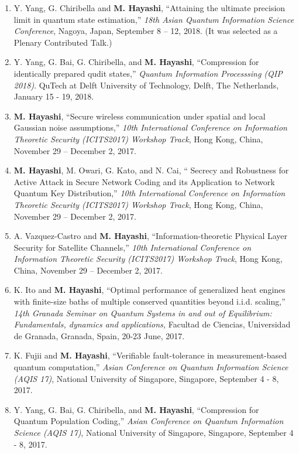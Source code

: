 \documentclass[a4paper,12pt,oneside]{article}
\begin{document}
\begin{enumerate}
\item 
Y. Yang, G. Chiribella and \textbf{M. Hayashi},
``Attaining the ultimate precision limit in quantum state estimation,''
{\em 18th Asian Quantum Information Science Conference},
Nagoya, Japan, September 8 -- 12, 2018.
(It was selected as a Plenary Contributed Talk.)

\item 
Y. Yang, G. Bai, G. Chiribella, and \textbf{M. Hayashi}, 
``Compression for identically prepared qudit states,'' 
{\em Quantum Information Processsing (QIP 2018)}.
QuTech at Delft University of Technology, Delft, The Netherlands,
January 15 - 19, 2018.

\item 
\textbf{M. Hayashi},
``Secure wireless communication under spatial and local Gaussian noise assumptions,''
{\em 10th International Conference on Information Theoretic Security (ICITS2017) Workshop Track}, 
Hong Kong, China, November 29  -- December 2, 2017.


\item 
\textbf{M. Hayashi}, M. Owari, G. Kato, and N. Cai,
`` Secrecy and Robustness for Active Attack in Secure Network Coding and its Application to  Network Quantum Key Distribution,''
{\em 10th International Conference on Information Theoretic Security (ICITS2017) Workshop Track}, 
Hong Kong, China, November 29  -- December 2, 2017.


\item 
A. Vazquez-Castro and \textbf{M. Hayashi},
``Information-theoretic Physical Layer Security for Satellite Channels,''
{\em 10th International Conference on Information Theoretic Security (ICITS2017) Workshop Track}, 
Hong Kong, China, November 29  -- December 2, 2017.

\item 
K. Ito and \textbf{M. Hayashi}, 
``Optimal performance of generalized heat engines with finite-size baths of multiple conserved quantities beyond i.i.d. scaling,'' 
{\em 14th Granada Seminar on Quantum Systems
in and out of Equilibrium: Fundamentals, dynamics and applications,} 
Facultad de Ciencias, Universidad de Granada, Granada, Spain, 20-23 June, 2017.

\item 
K. Fujii and \textbf{M. Hayashi}, ``Verifiable fault-tolerance in measurement-based quantum computation,'' 
{\em Asian Conference on Quantum Information Science (AQIS 17)}, 
National University of Singapore, Singapore, September 4 - 8, 2017.

\item 
Y. Yang, G. Bai, G. Chiribella, and \textbf{M. Hayashi}, ``Compression for Quantum Population Coding,'' 
{\em Asian Conference on Quantum Information Science (AQIS 17)}, 
National University of Singapore, Singapore, September 4 - 8, 2017.


\end{enumerate}
\end{document}
